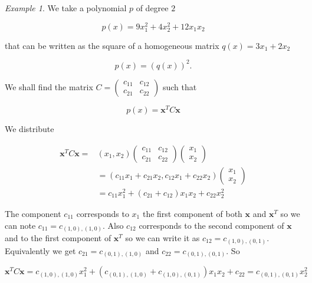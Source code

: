 \documentclass[onecolumn,11pt,a4paper]{article}
\theoremstyle{plain}  %
\theoremstyle{remark}  %
\newtheorem{example}[theorem]{Example}
\begin{document}
	\begin{example}
		We take a polynomial $p$ of degree $2$ 
	
		\begin{equation*}
			p (x) = 9x_1^2 + 4 x_2^2 + 12 x_1 x_2  
		\end{equation*}

that can be written as the square of a homogeneous matrix $q(x) =  3 x_1 + 2 x_2 $

\begin{equation*}
	p(x) = \left( q(x) \right)^2.
\end{equation*}

We shall find the matrix $ C = \begin{pmatrix}c_{11} & c_{12} \\ c_{21} & c_{22}
\end{pmatrix} $ such that 

\begin{equation*}
	p(x) = \mathbf{x}^T C \mathbf{x}
\end{equation*}

We distribute 

\begin{align*}
	\mathbf{x}^T C \mathbf{x} = & \left( x_1, x_2 \right) \begin{pmatrix}c_{11} & c_{12} \\ c_{21} & c_{22}
	\end{pmatrix} \begin{pmatrix}x_{1} \\ x_{2} \end{pmatrix} \\
	& = \left( c_{11} x_1 + c_{21} x_2, c_{12} x_1 + c_{22} x_2 \right)
	\begin{pmatrix}x_{1} \\ x_{2} \end{pmatrix}  \\
	& = c_{11} x_1^2 + \left( c_{21} + c_{12} \right) x_1 x_2 + c_{22} x_2^2
\end{align*}

The component $c_{11}$ corresponds to $x_1$ the first component of both $\mathbf{x}$
and $\mathbf{x}^T$ so we can note $c_{11} = c_{(1, 0),(1, 0)}$. Also $c_{12}$ corresponds to the second component of $\mathbf{x}$ and to the
first component of $\mathbf{x}^T$ so we can write it as $c_{12} = c_{(1,
0),(0,1)}$. Equivalently we get $c_{21} = c_{(0, 1),(1, 0)} $ and $ c_{22} = c_{(0, 1),(0, 1)}$. So 

\[
	\mathbf{x}^T C \mathbf{x} = c_{(1, 0),(1, 0)} x_1^2 + \left( c_{(0, 1),(1, 0)} + c_{(1,
	0),(0,1)} \right) x_1 x_2 + c_{22} = c_{(0, 1),(0, 1)} x_2^2
\]


\end{example}
\end{document}
